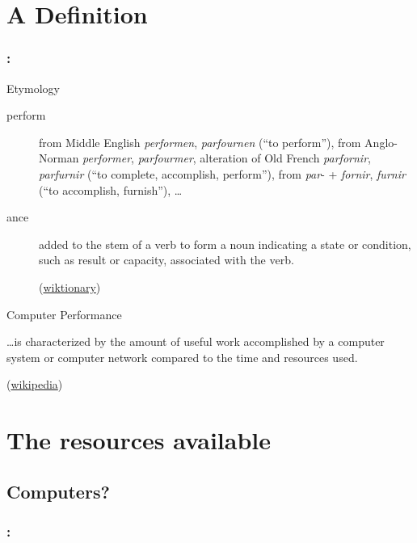 \documentclass[9pt,xcolor=table]{beamer}
\begin{document}
\section{A Definition}
\begin{frame}
\frametitle{\insertsectionhead{} : \insertpart{}
}
\vfill
\begin{block}{Etymology}
  \begin{description}
  \item[perform] from Middle English \textit{performen}, \textit{parfournen} (``to perform''), from Anglo-Norman \textit{performer}, \textit{parfourmer}, alteration of Old French \textit{parfornir}, \textit{parfurnir} (``to complete, accomplish, perform''), from \textit{par}- + \textit{fornir}, \textit{furnir} (``to accomplish, furnish''), \dots
  \item[ance] added to the stem of a verb to form a noun indicating a state or condition, such as result or capacity, associated with the verb.\\
    \begin{flushright}
      \small(\href{http://en.wiktionary.org/wiki/perform}{wiktionary})
    \end{flushright}

  \end{description}
\end{block}
\vfill
\begin{block}{Computer Performance}
  \begin{center}
    \dots is characterized by the amount of useful work accomplished by a computer system or computer network compared to the time and resources used.\\
  \end{center}
  \begin{flushright}
    \small(\href{http://en.wikipedia.org/wiki/Computer_performance}{wikipedia})
  \end{flushright}

  \end{block}
\vfill
\end{frame}

\section[Resources]{The resources available}
\subsection{Computers?}
\begin{frame}
\frametitle{\insertsectionhead{}: \insertsubsection{}}
\end{frame}
\end{document}
